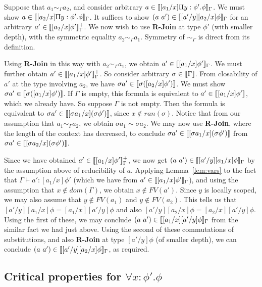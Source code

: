 \documentclass[copyright]{eptcs}
\newcommand{\interp}[1]{[\negthinspace[#1]\negthinspace]}
\begin{document}
Suppose that $a_1\sim_\Gamma a_2$, and consider arbitrary
$a\in\interp{[a_1/x]\Pi y:\phi'.\phi}_\Gamma$.  We must show
$a\in\interp{[a_2/x]\Pi y:\phi'.\phi}_\Gamma$.  It suffices to show
$(a\ a')\in\interp{[a'/y][a_2/x]\phi}_\Gamma$ for an arbitrary
$a'\in\interp{[a_2/x]\phi'}^+_\Gamma$.  We now wish to use
\textbf{R-Join} at type $\phi'$ (with smaller depth), with the
symmetric equality $a_2\sim_\Gamma a_1$.  Symmetry of $\sim_\Gamma$ is
direct from its definition.

Using \textbf{R-Join} in this way with $a_2\sim_\Gamma a_1$, we obtain
$a'\in\interp{[a_1/x]\phi'}_\Gamma$.  We must further obtain
$a'\in\interp{[a_1/x]\phi'}^+_\Gamma$.  So consider arbitrary
$\sigma\in\interp{\Gamma}$.  From closability of $a'$ at the type
involving $a_2$, we have $\sigma a'\in\interp{\sigma ([a_2/x]\phi')}$.
We must show $\sigma a'\in\interp{\sigma ([a_1/x]\phi')}$.  If
$\Gamma$ is empty, this formula is equivalent to
$a'\in\interp{[a_1/x]\phi'}$, which we already have.  So suppose
$\Gamma$ is not empty.  Then the formula is equivalent to $\sigma
a'\in\interp{[\sigma a_1/x](\sigma \phi')}$, since
$x\not\in\textit{ran}(\sigma)$.  Notice that from our assumption that
$a_1\sim_\Gamma a_2$, we obtain $\sigma a_1 \sim \sigma a_2$.  We may
now use \textbf{R-Join}, where the length of the context has
decreased, to conclude $\sigma a'\in\interp{[\sigma a_1/x](\sigma
  \phi')}$ from $\sigma a'\in\interp{[\sigma a_2/x](\sigma \phi')}$.

Since we have obtained $a'\in\interp{[a_1/x]\phi'}^+_\Gamma$, we now get
$(a\ a')\in\interp{[a'/y][a_1/x]\phi}_\Gamma$ by the assumption above
of reducibility of $a$.  Applying Lemma~\ref{lem:vars} to the fact
that $\Gamma\vdash a':[a_1/x]\phi'$ (which we have from
$a'\in\interp{[a_1/x]\phi'}_\Gamma$), and using the assumption that
$x\not\in\textit{dom}(\Gamma)$, we obtain $x\not\in\textit{FV}(a')$.
Since $y$ is locally scoped, we may also assume that
$y\not\in\textit{FV}(a_1)$ and $y\not\in\textit{FV}(a_2)$. This tells
us that $[a'/y][a_1/x]\phi = [a_1/x][a'/y]\phi$ and also
$[a'/y][a_2/x]\phi = [a_2/x][a'/y]\phi$.  Using the first of these, we
may conclude $(a\ a')\in\interp{[a_1/x][a'/y]\phi}_\Gamma$ from the
similar fact we had just above.  Using the second of these
commutations of substitutions, and also \textbf{R-Join} at type
$[a'/y]\phi$ (of smaller depth), we can conclude
$(a\ a')\in\interp{[a'/y][a_2/x]\phi}_\Gamma$, as required.

\subsection{Critical properties for $\forall x:\phi'.\phi$}
\end{document}
